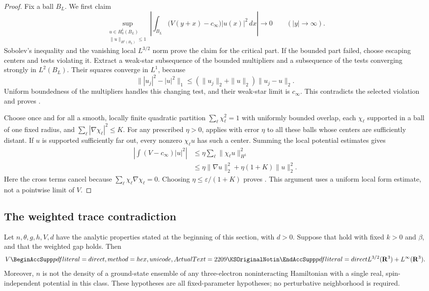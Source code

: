 \begin{proof}
Fix a ball \(B_L\).  We first claim
\begin{equation}
 \sup_{\substack{u\in H^1_0(B_L)\\\|u\|_{H^1(B_L)}\le1}}
 \left|\int_{B_L}\bigl(V(y+x)-c_\infty\bigr)|u(x)|^2\,dx\right|
 \longrightarrow0\qquad (|y|\to\infty).
 \label{eq:local-form-uniformity}
\end{equation}
Sobolev's inequality and the vanishing local \(L^{3/2}\) norm prove the
claim for the critical part.  If the bounded part failed, choose escaping
centers and tests violating it.  Extract a weak-star subsequence of the
bounded multipliers and a subsequence of the tests converging strongly
in \(L^2(B_L)\).  Their squares converge in \(L^1\), because
\[
 \bigl\||u_j|^2-|u|^2\bigr\|_1
 \le(\|u_j\|_2+\|u\|_2)\|u_j-u\|_2.
\]
Uniform boundedness of the multipliers handles this changing test, and
their weak-star limit is \(c_\infty\).  This contradicts the selected
violation and proves .

Choose once and for all a smooth, locally finite quadratic partition
\(\sum_\ell\chi_\ell^2=1\) with uniformly bounded overlap, each
\(\chi_\ell\) supported in a ball of one fixed radius, and
\(\sum_\ell|\nabla\chi_\ell|^2\le K\).  For any prescribed
\(\eta>0\),  applies with error \(\eta\)
to all these balls whose centers are sufficiently distant.  If \(u\)
is supported sufficiently far out, every nonzero \(\chi_\ell u\) has
such a center.  Summing the local potential estimates gives
\begin{align*}
 \left|\int(V-c_\infty)|u|^2\right|
 &\le\eta\sum_\ell\|\chi_\ell u\|_{H^1}^2\\
 &\le\eta\|\nabla u\|_2^2+\eta(1+K)\|u\|_2^2.
\end{align*}
Here the cross terms cancel because
\(\sum_\ell\chi_\ell\nabla\chi_\ell=0\).  Choosing
\(\eta\le\varepsilon/(1+K)\) proves
.  This argument uses a uniform local
form estimate, not a pointwise limit of \(V\).
\end{proof}

\subsection{The weighted trace contradiction}

\begin{theorem}
\label{thm:obstruction}
Let \(n,\theta,g,h,V,d\) have the analytic properties stated at the
beginning of this section, with \(d>0\).  Suppose that
 hold with fixed
\(k>0\) and \(\beta\), and that the weighted gap
 holds.  Then
\[
 V\notin L^{3/2}(\R^3)+L^\infty(\R^3).
\]
Moreover, \(n\) is not the density of a ground-state ensemble of any
three-electron noninteracting Hamiltonian with a single real,
spin-independent potential in this class.  These hypotheses are all
fixed-parameter hypotheses; no perturbative neighborhood is required.
\end{theorem}

